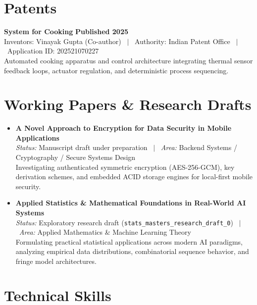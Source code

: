 \documentclass[10pt,a4paper]{article}
\begin{document}
\section*{Patents}

\textbf{System for Cooking} \hfill \textbf{Published 2025} \\
Inventors: Vinayak Gupta (Co-author) \ $\vert$ \ Authority: Indian Patent Office \ $\vert$ \ Application ID: 202521070227 \\
\small Automated cooking apparatus and control architecture integrating thermal sensor feedback loops, actuator regulation, and deterministic process sequencing.

\vspace{3pt}
\section*{Working Papers \& Research Drafts}

\begin{itemize}
  \item \textbf{A Novel Approach to Encryption for Data Security in Mobile Applications} \\
  \textit{Status:} Manuscript draft under preparation \ $\vert$ \ \textit{Area:} Backend Systems / Cryptography / Secure Systems Design \\
  \small Investigating authenticated symmetric encryption (AES-256-GCM), key derivation schemes, and embedded ACID storage engines for local-first mobile security.
  \item \textbf{Applied Statistics \& Mathematical Foundations in Real-World AI Systems} \\
  \textit{Status:} Exploratory research draft (\texttt{stats\_masters\_research\_draft\_0}) \ $\vert$ \ \textit{Area:} Applied Mathematics \& Machine Learning Theory \\
  \small Formulating practical statistical applications across modern AI paradigms, analyzing empirical data distributions, combinatorial sequence behavior, and fringe model architectures.
\end{itemize}

\section*{Technical Skills}
\end{document}
